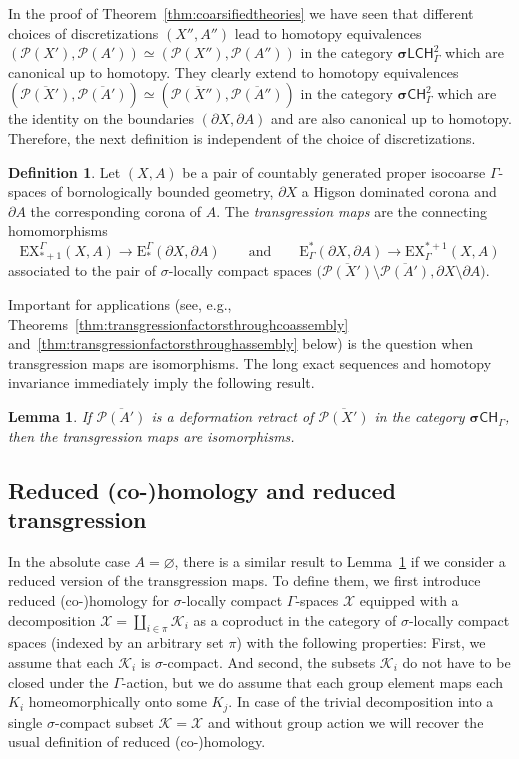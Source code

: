 \documentclass[pdftex]{sigma}
\numberwithin{equation}{section}
\newtheorem{lem}[thm]{Lemma}
\theoremstyle{definition}
\newtheorem{defn}[thm]{Definition}
\newcommand{\cP}{\mathcal{P}}
\newcommand{\cX}{\mathcal{X}}
\newcommand{\cK}{\mathcal{K}}
\newcommand{\categoryfont}[1]{\mathsf{#1}}
\newcommand{\sLCHz}[1][\Gamma]{\boldsymbol\sigma\categoryfont{LCH}_{#1}^2}
\newcommand{\sCH}[1][\Gamma]{\boldsymbol\sigma\categoryfont{CH}_{#1}}
\newcommand{\sCHz}[1][\Gamma]{\boldsymbol\sigma\categoryfont{CH}_{#1}^2}
\newcommand{\Homol}{\mathrm{E}}
\newcommand{\Cohom}{\mathrm{E}}
\newcommand{\HomolX}{\mathrm{EX}}
\newcommand{\CohomX}{\mathrm{EX}}
\begin{document}
In the proof of Theorem~\ref{thm:coarsifiedtheories} we have seen that different choices of discretizations $(X'',A'')$ lead to homotopy equivalences $(\cP(X'),\cP(A'))\simeq (\cP(X''),\cP(A''))$ in the category $\sLCHz$ which are canonical up to homotopy. They clearly extend to homotopy equivalences $(\overline{\cP(X')},\overline{\cP(A')})\simeq (\overline{\cP(X'')},\overline{\cP(A'')})$ in the category $\sCHz$ which are the identity on the boundaries $(\partial X,\partial A)$ and are also canonical up to homotopy. Therefore, the next definition is independent of the choice of discretizations.


\begin{defn}
Let $(X,A)$ be a pair of countably generated proper isocoarse $\Gamma$-spaces of bornologically bounded geometry, $\partial X$ a Higson dominated corona and $\partial A$ the corresponding corona of $A$.
The \emph{transgression maps} are the connecting homomorphisms
\[
\HomolX_{*+1}^\Gamma(X,A)\to\Homol_*^\Gamma(\partial X,\partial A)\qquad\text{and}\qquad \Cohom^*_\Gamma(\partial X,\partial A)\to \CohomX^{*+1}_\Gamma(X,A)
\]
associated to the pair of $\sigma$-locally compact spaces $\big(\overline{\cP(X')}\setminus\overline{\cP(A')},\partial X\setminus\partial A\big)$.
\end{defn}

Important for applications (see, e.g., Theorems~\ref{thm:transgressionfactorsthroughcoassembly} and~\ref{thm:transgressionfactorsthroughassembly} below) is the question when transgression maps are isomorphisms. The long exact sequences and homotopy invariance immediately imply the following result.

\begin{lem}\label{lem:relativetransgressionisos}
If $\overline{\cP(A')}$ is a deformation retract of $\overline{\cP(X')}$ in the category $\sCH$, then the transgression maps are isomorphisms.
\end{lem}

\subsection{Reduced (co-)homology and reduced transgression}\label{sec:reducedtransgression}

In the absolute case $A=\varnothing$, there is a similar result to Lemma~\ref{lem:relativetransgressionisos} if we consider a reduced version of the transgression maps.
To define them, we first introduce reduced (co-)homology for $\sigma$-locally compact $\Gamma$-spaces $\cX$ equipped with a decomposition $\cX=\coprod_{i\in \pi}\cK_i$ as a coproduct in the category of $\sigma$-locally compact spaces (indexed by an arbitrary set $\pi$) with the following properties: First, we assume that each $\cK_i$ is $\sigma$-compact. And second, the subsets $\cK_i$ do not have to be closed under the $\Gamma$-action, but we do assume that each group element maps each $K_i$ homeomorphically onto some $K_j$.
In case of the trivial decomposition into a single $\sigma$-compact subset $\cK=\cX$ and without group action we will recover the usual definition of reduced (co-)homology.
\end{document}
